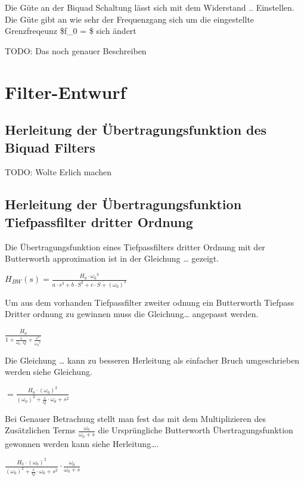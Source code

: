 \documentclass[
  ngerman,
  letterpaper,
  DIV=11]{scrreprt}
\begin{document}
Die Güte an der Biquad Schaltung lässt sich mit dem Widerstand ..
Einstellen. Die Güte gibt an wie sehr der Frequenzgang sich um die
eingestellte Grenzfreqeunz \$f\_0 =  \$ sich
ändert

TODO: Das noch genauer Beschreiben

\chapter{Filter-Entwurf}\label{filter-entwurf}

\section{Herleitung der Übertragungsfunktion des Biquad
Filters}\label{herleitung-der-uxfcbertragungsfunktion-des-biquad-filters}

TODO: Wolte Erlich machen

\section{Herleitung der Übertragungsfunktion Tiefpassfilter dritter
Ordnung}\label{herleitung-der-uxfcbertragungsfunktion-tiefpassfilter-dritter-ordnung}

Die Übertragungsfunktion eines Tiefpassfilters dritter Ordnung mit der
Butterworth approximation ist in der Gleichung \ldots{} gezeigt.

\(H_{BW}(s) = \frac{H_0 \cdot {\omega_0}^3}{a\cdot s^3 +b\cdot S^2 +c \cdot S + (\omega_0)^3}\)

Um aus dem vorhanden Tiefpassfilter zweiter odnung ein Butterworth
Tiefpass Dritter ordnung zu gewinnen muss die Gleichung\ldots{}
angepasst werden.

\(\frac{H_0}{1+\frac{s}{\omega_0 \cdot Q} + \frac{s^2}{{\omega_0}^2}}\)

Die Gleichung \ldots{} kann zu besseren Herleitung als einfacher Bruch
umgeschrieben werden siehe Gleichung.

\(= \frac{H_0 \cdot (\omega_0)^2}{(\omega_0)^2+\frac{s}{Q} \cdot \omega_0 +s^2}\)

Bei Genauer Betrachung stellt man fest das mit dem Multiplizieren des
Zusätzlichen Terms \(\frac{\omega_0}{\omega_0 + s}\) die Ursprüngliche
Butterworth Übertragungsfunktion gewonnen werden kann siehe
Herleitung\ldots.

\(\frac{H_0 \cdot (\omega_0)^2}{(\omega_0)^2+\frac{s}{Q} \cdot \omega_0 +s^2} \cdot \frac{\omega_0}{\omega_0 + s}\)
\end{document}
